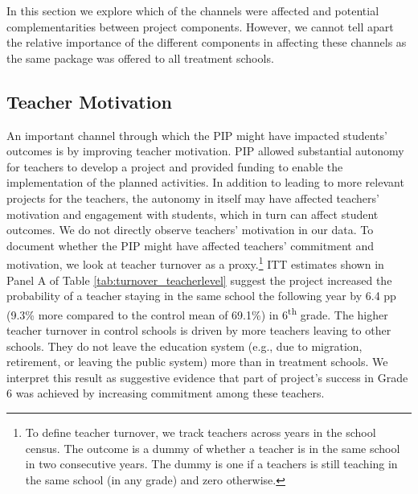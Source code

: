 \documentclass[11pt,a4paper]{article}
\begin{document}
In this section we explore which of the channels were affected and potential complementarities between project components. However, we cannot tell apart the relative importance of the different components in affecting these channels as the same package was offered to all treatment schools. 

\subsection{Teacher Motivation} \label{sec:turnover}

An important channel through which the PIP might have impacted students' outcomes is by improving teacher motivation. PIP allowed substantial autonomy for teachers to develop a project and provided funding to enable the implementation of the planned activities. In addition to leading to more relevant projects for the teachers, the autonomy in itself may have affected teachers' motivation and engagement with students, which in turn can affect student outcomes. We do not directly observe teachers' motivation in our data. To document whether the PIP might have affected teachers' commitment and motivation, we look at teacher turnover as a proxy.\footnote{To define teacher turnover, we track teachers across years in the school census. The outcome is a dummy of whether a teacher is in the same school in two consecutive years. The dummy is one if a teachers is still teaching in the same school (in any grade) and zero otherwise.} ITT estimates shown in Panel A of Table \ref{tab:turnover_teacherlevel} suggest the project increased the probability of a teacher staying in the same school the following year by 6.4 pp (9.3\% more compared to the control mean of 69.1\%) in 6\textsuperscript{th} grade. The higher teacher turnover in control schools is driven by more teachers leaving to other schools. They do not leave the education system (e.g., due to migration, retirement, or leaving the public system) more than in treatment schools. We interpret this result as suggestive evidence that part of project's success in Grade 6 was achieved by increasing commitment among these teachers. 
\end{document}
